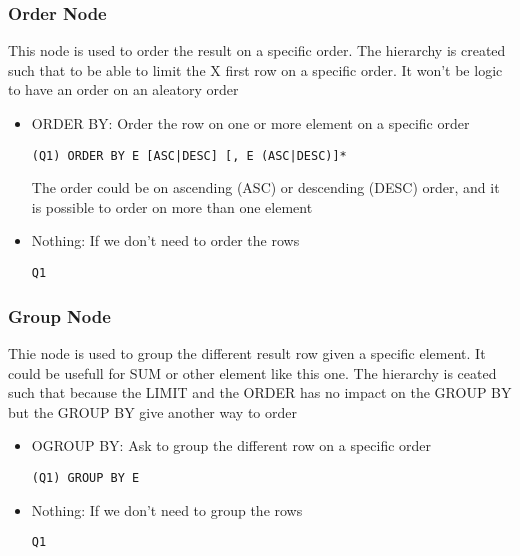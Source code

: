 \documentclass{article}
\begin{document}
\subsubsection{Order Node}
This node is used to order the result on a specific order. The hierarchy is created such that to be able to limit the X first row on a specific order. It won't be logic to have an order on an aleatory order
\begin{itemize}
\item ORDER BY: Order the row on one or more element on a specific order
\begin{verbatim}
(Q1) ORDER BY E [ASC|DESC] [, E (ASC|DESC)]*
\end{verbatim}
The order could be on ascending (ASC) or descending (DESC) order, and it is possible to order on more than one element
\item Nothing:  If we don't need to order the rows
\begin{verbatim}
Q1
\end{verbatim}
\end{itemize}
\subsubsection{Group Node}
Thie node is used to group the different result row given a specific element. It could be usefull for SUM or other element like this one. The hierarchy is ceated such that because the LIMIT and the ORDER has no impact on the GROUP BY but the GROUP BY give another way to order
\begin{itemize}
\item OGROUP BY: Ask to group the different row on a specific order
\begin{verbatim}
(Q1) GROUP BY E
\end{verbatim}
\item Nothing:  If we don't need to group the rows
\begin{verbatim}
Q1
\end{verbatim}
\end{itemize}
\end{document}
